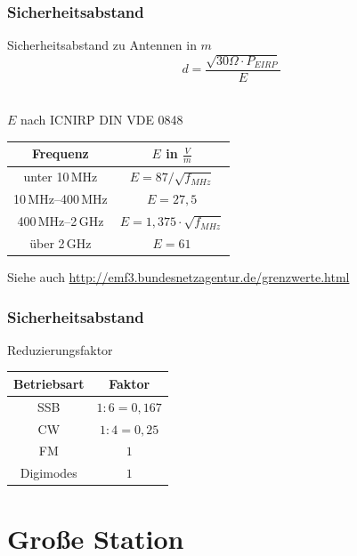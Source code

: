 \begin{frame}
  \frametitle{Sicherheitsabstand}
  \begin{center}
    \begin{block}{Sicherheitsabstand zu Antennen in $m$}
      $$d = \frac{\sqrt{30\Omega \cdot P_{EIRP}}}{E}$$ \\[3em]
      \begin{center}
        $E$ nach ICNIRP DIN VDE 0848 \\[1em]
        \begin{tabular}{c|c}
          Frequenz & $E$ in $\frac{V}{m}$ \\ \hline \hline
          unter 10\,MHz & $E = 87 / \sqrt{f_{MHz}}$ \\ \hline
          10\,MHz--400\,MHz & $E = 27,5$ \\ \hline
          400\,MHz--2\,GHz & $E = 1,375 \cdot \sqrt{f_{MHz}}$ \\ \hline
          über 2\,GHz & $E = 61$
        \end{tabular}
      \end{center}
    \end{block}
  \end{center}
  Siehe auch \url{http://emf3.bundesnetzagentur.de/grenzwerte.html}
\end{frame}

\begin{frame}
  \frametitle{Sicherheitsabstand}
  \begin{center}
    \begin{block}{Reduzierungsfaktor}
      \begin{center}
        \begin{tabular}{c|c}
          Betriebsart & Faktor \\ \hline \hline
          SSB & $1:6 = 0,167$ \\ \hline
          CW & $1:4 = 0,25$ \\ \hline
          FM & $1$ \\ \hline
          Digimodes & $1$
        \end{tabular} \end{center}
      \end{block}
    \end{center}
  \end{frame}

\section*{Große Station}

